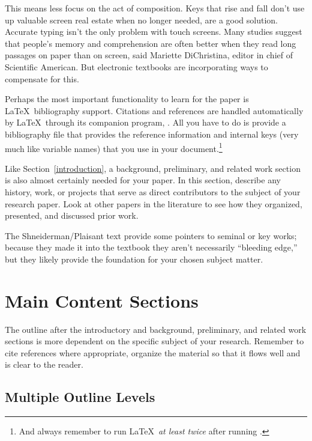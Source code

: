 \documentclass{article}
\begin{document}
This means less focus on the act of composition. Keys that rise and fall don't use up valuable screen real estate when no longer needed, are a good solution. Accurate typing isn't the only problem with touch screens. Many studies suggest that people's memory and comprehension are often better when they read long passages on paper than on screen, said Mariette DiChristina, editor in chief of Scientific American. But electronic textbooks are incorporating ways to compensate for this.

Perhaps the most important functionality to learn for the paper is \LaTeX\ bibliography support.  Citations and references are handled automatically by \LaTeX\ through its companion program, \BibTeX.  All you have to do is provide a bibliography file that provides the reference information and internal keys (very much like variable names) that you use in your document.\footnote{And always remember to run \LaTeX\ \emph{at least twice} after running \BibTeX.}

Like Section~\ref{introduction}, a background, preliminary, and related work section is also almost certainly needed for your paper.  In this section, describe any history, work, or projects that serve as direct contributors to the subject of your research paper.  Look at other papers in the literature to see how they organized, presented, and discussed prior work.

The Shneiderman/Plaisant text \cite{dui} provide some pointers to seminal or key works; because they made it into the textbook they aren't necessarily ``bleeding edge,'' but they likely provide the foundation for your chosen subject matter.

\section{Main Content Sections}

The outline after the introductory and background, preliminary, and related work sections is more dependent on the specific subject of your research.  Remember to cite references where appropriate, organize the material so that it flows well and is clear to the reader.

\subsection{Multiple Outline Levels}
\end{document}
